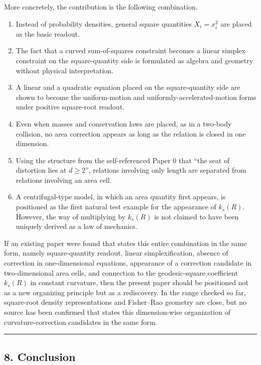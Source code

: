 \documentclass[
]{ltjsarticle}
\providecommand{\tightlist}{%
  \setlength{\itemsep}{0pt}\setlength{\parskip}{0pt}}
\begin{document}
More concretely, the contribution is the following combination.

\begin{enumerate}
\def\labelenumi{\arabic{enumi}.}
\tightlist
\item
  Instead of probability densities, general square quantities
  \(X_i=x_i^2\) are placed as the basic readout.
\item
  The fact that a curved sum-of-squares constraint becomes a linear
  simplex constraint on the square-quantity side is formulated as
  algebra and geometry without physical interpretation.
\item
  A linear and a quadratic equation placed on the square-quantity side
  are shown to become the uniform-motion and
  uniformly-accelerated-motion forms under positive square-root readout.
\item
  Even when masses and conservation laws are placed, as in a two-body
  collision, no area correction appears as long as the relation is
  closed in one dimension.
\item
  Using the structure from the self-referenced Paper 0 that ``the seat
  of distortion lies at \(d\ge2\)'', relations involving only length are
  separated from relations involving an area cell.
\item
  A centrifugal-type model, in which an area quantity first appears, is
  positioned as the first natural test example for the appearance of
  \(k_s(R)\). However, the way of multiplying by \(k_s(R)\) is not
  claimed to have been uniquely derived as a law of mechanics.
\end{enumerate}

If an existing paper were found that states this entire combination in
the same form, namely square-quantity readout, linear simplexification,
absence of correction in one-dimensional equations, appearance of a
correction candidate in two-dimensional area cells, and connection to
the geodesic-square coefficient \(k_s(R)\) in constant curvature, then
the present paper should be positioned not as a new organizing principle
but as a rediscovery. In the range checked so far, square-root density
representations and Fisher--Rao geometry are close, but no source has
been confirmed that states this dimension-wise organization of
curvature-correction candidates in the same form.

\begin{center}\rule{0.5\linewidth}{0.5pt}\end{center}

\subsection{8. Conclusion}\label{conclusion}
\end{document}
